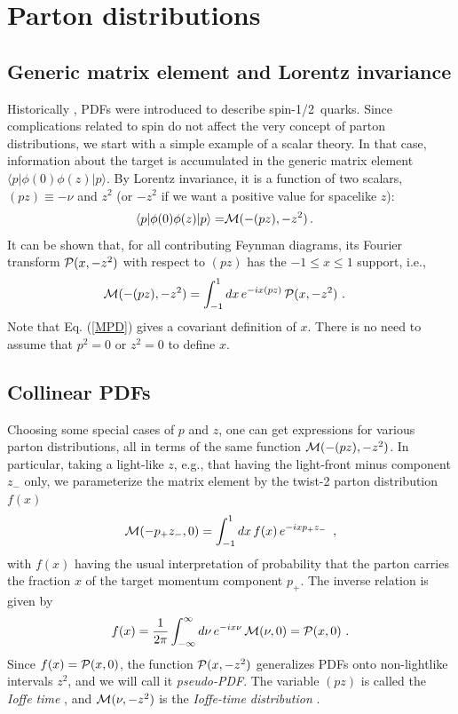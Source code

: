 \section{Parton distributions}

\subsection{Generic matrix element and
Lorentz invariance}

Historically \cite{Feynman:1973xc}, PDFs were introduced
to describe \mbox{spin-1/2 quarks.}
Since complications related to spin
do not affect
the very concept of parton distributions, we start with
a simple example of a scalar theory.
In that case, information about the target is accumulated
in the generic matrix element $\langle p | \phi (0) \phi(z) | p \rangle $.
By Lorentz invariance, it is a function of two scalars, $(pz) \equiv - \nu$ and $z^2$
(or $-z^2$ if we want a positive value for spacelike $z$):
\begin{align}
\langle p |   \phi(0) \phi (z)|p \rangle
=  & {\cal M} (-(pz), -z^2)
\, .
\label{lorentz}
\end{align}
It can be shown \cite{Radyushkin:2016hsy,Radyushkin:1983wh} that, for all contributing Feynman diagrams,
its Fourier transform ${\cal P} (x, -z^2)$ with respect to $(pz)$
has the $-1 \leq x \leq 1$ support, i.e.,
\begin{align}
{\cal M} (-(pz), -z^2)
&   =
\int_{-1}^1 dx
\, e^{-i x (pz) } \,  {\cal P} (x, -z^2)  \   .
\label{MPD}
\end{align}
Note that Eq. (\ref{MPD}) gives a covariant definition of $x$.
There is no need to assume that
$p^2=0$ or $z^2=0$ to define $x$.

\subsection{Collinear PDFs}

Choosing
some special cases of $p$ and $z$, one can get expressions for various parton distributions,
all in terms of the same function ${\cal M} (-(pz), -z^2)$.
In particular, taking a light-like $z$, e.g., that
having the light-front minus component $z_-$ only, we
parameterize the matrix element by the twist-2 parton distribution $f(x)$
\begin{align}
{\cal M} (-p_+ z_- , 0)  =
\int_{-1}^1 dx \, f(x) \,
e^{-ixp_+ z_-} \,  \   ,
\label{twist2par0}
\end{align}
with $f(x)$ having the usual interpretation of probability that
the parton carries the fraction $x$ of the target momentum
component $p_+$.
The inverse relation is given by
\begin{align}
f  (x)  =\frac{1}{2 \pi}  \int_{-\infty}^{\infty}  d\nu \, e^{-i x \nu}  \, {\cal M}(\nu , 0)    = {\cal P} (x, 0)
\  .
\label{fxMnu}
\end{align}
Since $f(x) =   {\cal P} (x, 0) $, the function $ {\cal P} (x, -z^2) $ generalizes
PDFs onto non-lightlike intervals $z^2$, and we will call it
{\it pseudo-PDF}. The variable $(pz)$ is called
the {\it Ioffe time} \cite{Ioffe:1969kf},
and ${\cal M}(\nu , -z^2) $ is the {\it Ioffe-time distribution} \cite{Braun:1994jq}.

